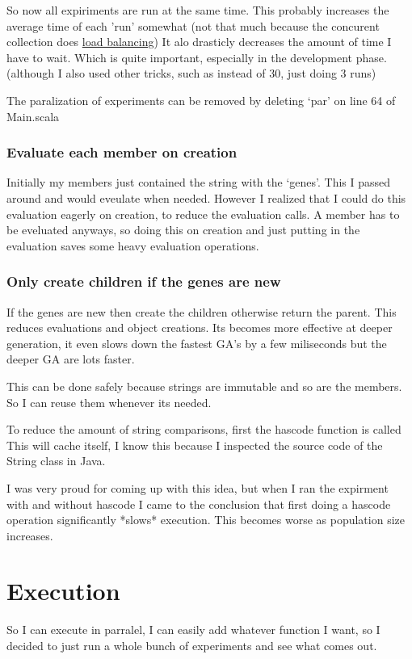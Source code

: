 \documentclass{article}
\begin{document}
\begin{empfile}
So now all expiriments are run at the same time. This probably increases the
average time of each 'run' somewhat (not that much because the concurent
collection does \href{http://docs.scala-lang.org/overviews/parallel-collections/configuration.html}{load balancing})
It alo drasticly decreases the amount of time I have to wait. Which is quite
important, especially in the development phase. (although I also used
other tricks, such as instead of 30, just doing 3 runs)

The paralization of experiments can be removed by deleting `par' on line 64
of Main.scala

\subsubsection{Evaluate each member on creation}
Initially my members just contained the string with the `genes'. This I passed
around and would eveulate when needed. However I realized that I could do this
evaluation eagerly on creation, to reduce the evaluation calls. A member has
to be eveluated anyways, so doing this on creation and just putting in the
evaluation saves some heavy evaluation operations.

\subsubsection{Only create children if the genes are new}
If the genes are new then create the children otherwise return the parent.
This reduces evaluations and object creations. Its becomes more effective
at deeper generation, it even slows down the fastest GA's by a few miliseconds
but the deeper GA are lots faster.

This can be done safely because strings are immutable and so are the members.
So I can reuse them whenever its needed.

To reduce the amount of string comparisons, first the hascode function is called
This will cache itself, I know this because I inspected the source code of the
String class in Java.

I was very proud for coming up with  this idea, but when I ran the expirment with
and without hascode I came to the conclusion that first doing a hascode operation
significantly *slows* execution. This becomes worse as population size increases.

\section{Execution}
So I can execute in parralel, I can easily add whatever function I want, so
I decided to just run a whole bunch of experiments and see what comes out.


\end{empfile}
\end{document}
